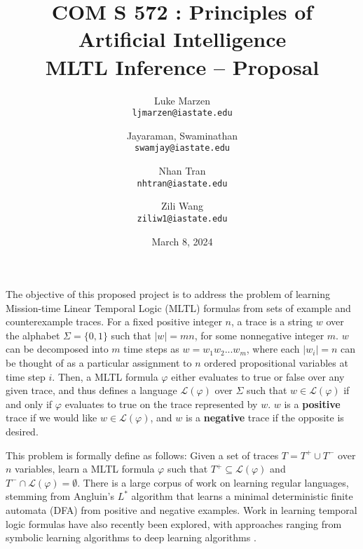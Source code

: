 \documentclass[12pt]{article}
\renewcommand{\phi}{\varphi}
\begin{document}
\title{\bf
\large COM S 572 : Principles of Artificial Intelligence \\
\large MLTL Inference -- Proposal}

\author{
  Luke Marzen\\
  \texttt{ljmarzen@iastate.edu}
  \and
  Jayaraman, Swaminathan\\
  \texttt{swamjay@iastate.edu}
  \and
  Nhan Tran\\
  \texttt{nhtran@iastate.edu}
  \and
  Zili Wang\\
  \texttt{ziliw1@iastate.edu}
}

\date{March 8, 2024}

\maketitle


The objective of this proposed project is to address the problem of learning Mission-time Linear Temporal Logic (MLTL) formulas from sets of example and counterexample traces.
For a fixed positive integer $n$, a trace is a string $w$ over the alphabet $\Sigma = \{0, 1\}$ such that $|w| = mn$, for some nonnegative integer $m$. 
$w$ can be decomposed into $m$ time steps as $w = w_1 w_2 ... w_m$, where each $|w_i| = n$ can be thought of as a particular assignment to $n$ ordered propositional variables at time step $i$.
Then, a MLTL formula $\phi$ either evaluates to true or false over any given trace, and thus defines a language $\mathcal{L}(\phi)$ over $\Sigma$ such that $w \in \mathcal{L}(\phi)$ if and only if $\phi$ evaluates to true on the trace represented by $w$.
$w$ is a \textbf{positive} trace if we would like $w \in \mathcal{L}(\phi)$, and $w$ is a \textbf{negative} trace if the opposite is desired. 

This problem is formally define as follows: Given a set of traces $T = T^+ \cup T^-$ over $n$ variables, learn a MLTL formula $\phi$ such that $T^+ \subseteq \mathcal{L}(\phi)$ and $T^- \cap \mathcal{L}(\phi) = \emptyset$. There is a large corpus of work on learning regular languages, stemming from Angluin's $L^*$ algorithm \cite{ANGLUIN_Lstar} that learns a minimal deterministic finite automata (DFA) from positive and negative examples. Work in learning temporal logic formulas have also recently been explored, with approaches ranging from symbolic learning algorithms \cite{roy_ltlf_learning, camacho_ltlf_learning} to deep learning algorithms \cite{stl_learning, Luo_Liang_Du_Wan_Peng_Zhang_2022}.
\end{document}
